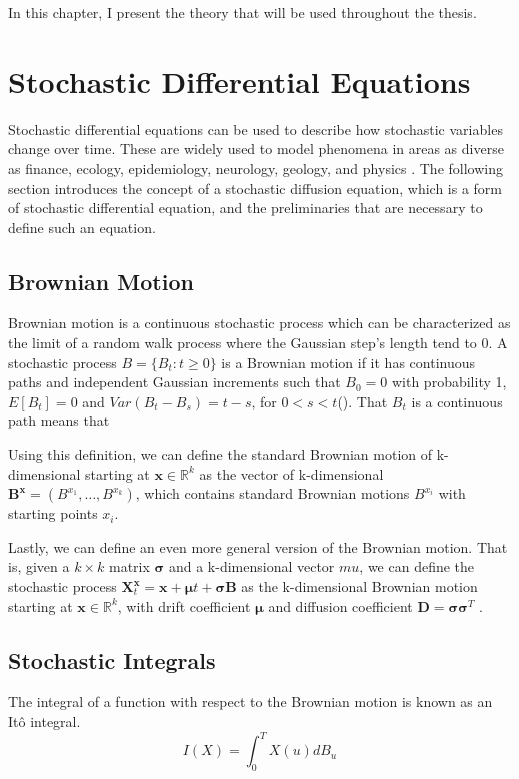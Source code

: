 In this chapter, I present the theory that will be used throughout the thesis.



\section{Stochastic Differential Equations}
Stochastic differential equations can be used to describe how stochastic variables change over time. These are widely used to model phenomena in areas as diverse as finance, ecology, epidemiology, neurology, geology, and physics \cite{iacus_simulation_2008}. The following section introduces the concept of a stochastic diffusion equation, which is a form of stochastic differential equation, and the preliminaries that are necessary to define such an equation.


\subsection{Brownian Motion}
Brownian motion is a continuous stochastic process which can be characterized as the limit of a random walk process where the Gaussian step's length tend to 0. A stochastic process $B = \{B_t:t\geq 0\}$ is a Brownian motion if it has continuous paths and independent Gaussian increments such that $B_0 = 0$ with probability 1, $E[B_t] = 0$ and $Var(B_t - B_s) = t-s$, for $0 < s < t$(\cite{iacus_simulation_2008}).  That $B_t$ is a continuous path means that

Using this definition, we can define the standard Brownian motion of k-dimensional starting at $\textbf{x} \in \mathbb{R}^k$ as the vector of k-dimensional $\mathbf{B}^\mathbf{x} = (B^{x_1}, \dots , B^{x_k})$, which contains standard Brownian motions $B^{x_i}$ with starting points $x_i$\cite{bhattacharya_continuous_2023}.

Lastly, we can define an even more general version of the Brownian motion. That is, given a $k \times k$ matrix $\pmb{\sigma}$ and a k-dimensional vector $mu$, we can define the stochastic process $\mathbf{X}_t^\mathbf{x} = \mathbf{x} + \pmb{\mu}t + \pmb{\sigma} \mathbf{B}$ as the k-dimensional Brownian motion starting at $\mathbf{x} \in \mathbb{R}^k$, with drift coefficient $\pmb{\mu}$ and diffusion coefficient $\mathbf{D} = \pmb{\sigma} \pmb{\sigma}^T$ \cite{bhattacharya_continuous_2023}.

\subsection{Stochastic Integrals}
The integral of a function with respect to the Brownian motion is known as an Itô integral. 
$$I(X) = \int_0^T X(u)dB_u$$

